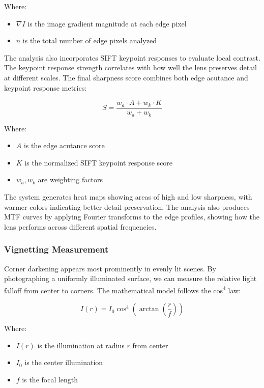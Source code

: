Where:
\begin{itemize}
    \item \( \nabla I \) is the image gradient magnitude at each edge pixel
    \item \( n \) is the total number of edge pixels analyzed
\end{itemize}

The analysis also incorporates SIFT keypoint responses to evaluate local contrast. The keypoint response strength correlates with how well the lens preserves detail at different scales. The final sharpness score combines both edge acutance and keypoint response metrics:

\begin{equation}
S = \frac{w_a \cdot A + w_k \cdot K}{w_a + w_k}
\end{equation}

Where:
\begin{itemize}
    \item \( A \) is the edge acutance score
    \item \( K \) is the normalized SIFT keypoint response score
    \item \( w_a, w_k \) are weighting factors
\end{itemize}

The system generates heat maps showing areas of high and low sharpness, with warmer colors indicating better detail preservation. The analysis also produces MTF curves by applying Fourier transforms to the edge profiles, showing how the lens performs across different spatial frequencies.

\subsubsection{Vignetting Measurement}
Corner darkening appears most prominently in evenly lit scenes. By photographing a uniformly illuminated surface, we can measure the relative light falloff from center to corners. The mathematical model follows the cos\textsuperscript{4} law:

\begin{equation}
I(r) = I_0 \cos^4\left(\arctan\left(\frac{r}{f}\right)\right)
\end{equation}

Where:
\begin{itemize}
    \item \( I(r) \) is the illumination at radius \( r \) from center
    \item \( I_0 \) is the center illumination
    \item \( f \) is the focal length
\end{itemize}


